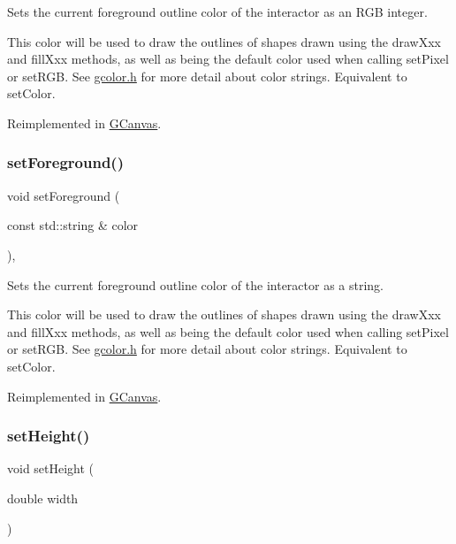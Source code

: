 Sets the current foreground outline color of the interactor as an R\+GB integer. 

This color will be used to draw the outlines of shapes drawn using the draw\+Xxx and fill\+Xxx methods, as well as being the default color used when calling set\+Pixel or set\+R\+GB. See \mbox{\hyperlink{gcolor_8h_source}{gcolor.\+h}} for more detail about color strings. Equivalent to set\+Color. 

Reimplemented in \mbox{\hyperlink{classGCanvas_a59f7cd2bd1708c12dfa52a8f7c7b79c9}{G\+Canvas}}.

\mbox{\label{classGDrawingSurface_af59209aeadea6dfc6d97a2d8531f50e1}} 
\subsubsection{\texorpdfstring{set\+Foreground()}{setForeground()}\hspace{0.1cm}{\footnotesize\ttfamily [2/2]}}
{\footnotesize\ttfamily void set\+Foreground (\begin{DoxyParamCaption}\item[{const std\+::string \&}]{color }\end{DoxyParamCaption})\hspace{0.3cm}{\ttfamily [virtual]}, {\ttfamily [inherited]}}



Sets the current foreground outline color of the interactor as a string. 

This color will be used to draw the outlines of shapes drawn using the draw\+Xxx and fill\+Xxx methods, as well as being the default color used when calling set\+Pixel or set\+R\+GB. See \mbox{\hyperlink{gcolor_8h_source}{gcolor.\+h}} for more detail about color strings. Equivalent to set\+Color. 

Reimplemented in \mbox{\hyperlink{classGCanvas_a8afbcf1f47750fb4c717f9ff36540235}{G\+Canvas}}.

\mbox{\label{classGWindow_a4b812426e19cdd9f6d62e7b5d90e6bec}} 
\subsubsection{\texorpdfstring{set\+Height()}{setHeight()}}
{\footnotesize\ttfamily void set\+Height (\begin{DoxyParamCaption}\item[{double}]{width }\end{DoxyParamCaption})\hspace{0.3cm}{\ttfamily [virtual]}}



